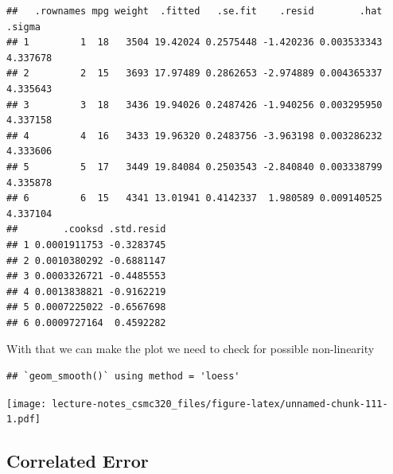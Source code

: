 \documentclass[12pt,]{book}
\newenvironment{Shaded}{\begin{snugshade}}{\end{snugshade}}
\newcommand{\KeywordTok}[1]{\textcolor[rgb]{0.13,0.29,0.53}{\textbf{#1}}}
\newcommand{\DataTypeTok}[1]{\textcolor[rgb]{0.13,0.29,0.53}{#1}}
\newcommand{\StringTok}[1]{\textcolor[rgb]{0.31,0.60,0.02}{#1}}
\newcommand{\OperatorTok}[1]{\textcolor[rgb]{0.81,0.36,0.00}{\textbf{#1}}}
\newcommand{\NormalTok}[1]{#1}
\theoremstyle{definition}
\theoremstyle{definition}
\theoremstyle{definition}
\theoremstyle{remark}
\begin{document}
\begin{Shaded}
\end{Shaded}

\begin{verbatim}
##   .rownames mpg weight  .fitted   .se.fit    .resid        .hat   .sigma
## 1         1  18   3504 19.42024 0.2575448 -1.420236 0.003533343 4.337678
## 2         2  15   3693 17.97489 0.2862653 -2.974889 0.004365337 4.335643
## 3         3  18   3436 19.94026 0.2487426 -1.940256 0.003295950 4.337158
## 4         4  16   3433 19.96320 0.2483756 -3.963198 0.003286232 4.333606
## 5         5  17   3449 19.84084 0.2503543 -2.840840 0.003338799 4.335878
## 6         6  15   4341 13.01941 0.4142337  1.980589 0.009140525 4.337104
##        .cooksd .std.resid
## 1 0.0001911753 -0.3283745
## 2 0.0010380292 -0.6881147
## 3 0.0003326721 -0.4485553
## 4 0.0013838821 -0.9162219
## 5 0.0007225022 -0.6567698
## 6 0.0009727164  0.4592282
\end{verbatim}

With that we can make the plot we need to check for possible
non-linearity

\begin{Shaded}
\end{Shaded}

\begin{verbatim}
## `geom_smooth()` using method = 'loess'
\end{verbatim}

\texttt{[image: lecture-notes\_csmc320\_files/figure-latex/unnamed-chunk-111-1.pdf]}

\subsection{Correlated Error}\label{correlated-error}
\end{document}

